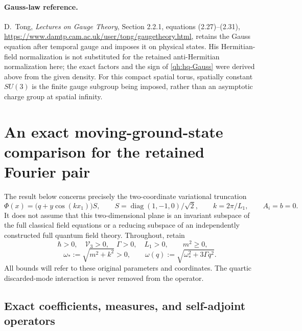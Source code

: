 \paragraph{Gauss-law reference.}
D.~Tong, \emph{Lectures on Gauge Theory}, Section 2.2.1,
equations (2.27)--\allowbreak(2.31),
\url{https://www.damtp.cam.ac.uk/user/tong/gaugetheory.html}, retains the Gauss equation after temporal
gauge and imposes it on physical states. His Hermitian-field
normalization is not substituted for the retained anti-Hermitian
normalization here; the exact factors and the sign of
\eqref{qh:hq-Gauss} were derived above from the given density.
For this compact spatial torus, spatially constant \(SU(3)\) is
the finite gauge subgroup being imposed, rather than an asymptotic
charge group at spatial infinity.
\par
\section{An exact moving-ground-state comparison for the retained Fourier pair}
\label{fq:section}

The result below concerns precisely the two-coordinate variational
truncation
\[
 \Phi(x)=\bigl(q+y\cos(kx_1)\bigr)S,\qquad
 S=\operatorname{diag}(1,-1,0)/\sqrt2,\qquad
 k=2\pi/L_1,\qquad A_i=b=0.
\]
It does not assume that this two-dimensional plane is an invariant
subspace of the full classical field equations or a reducing subspace
of an independently constructed full quantum field theory.
Throughout, retain
\[
 \hbar>0,\quad\mathcal V_3>0,\quad\Gamma>0,\quad L_1>0,
 \qquad m^2\geq0,
\]
\[
 \qquad \omega_*:=\sqrt{m^2+k^2}>0,
 \qquad \omega(q):=\sqrt{\omega_*^2+3\Gamma q^2}.
\]
All bounds will refer to these original parameters and coordinates.
The quartic discarded-mode interaction is never removed from the operator.

\subsection{Exact coefficients, measures, and self-adjoint operators}

